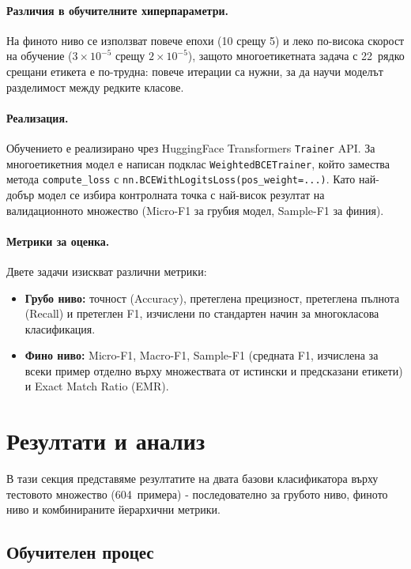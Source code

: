 \documentclass[12pt,a4paper]{report}
\begin{document}
\paragraph{Различия в обучителните хиперпараметри.} На финото ниво се използват повече епохи (10 срещу 5) и леко по-висока скорост на обучение ($3 \times 10^{-5}$ срещу $2 \times 10^{-5}$), защото многоетикетната задача с 22~рядко срещани етикета е по-трудна: повече итерации са нужни, за да научи моделът разделимост между редките класове.

\paragraph{Реализация.} Обучението е реализирано чрез HuggingFace Transformers \texttt{Trainer} API. За многоетикетния модел е написан подклас \texttt{WeightedBCETrainer}, който замества метода \texttt{compute\_loss} с \texttt{nn.BCEWithLogitsLoss(pos\_weight=...)}. Като най-добър модел се избира контролната точка с най-висок резултат на валидационното множество (Micro-F1 за грубия модел, Sample-F1 за финия).

\paragraph{Метрики за оценка.} Двете задачи изискват различни метрики:
\begin{itemize}
  \item \textbf{Грубо ниво:} точност (Accuracy), претеглена прецизност, претеглена пълнота (Recall) и претеглен F1, изчислени по стандартен начин за многокласова класификация.
  \item \textbf{Фино ниво:} Micro-F1, Macro-F1, Sample-F1 (средната F1, изчислена за всеки пример отделно върху множествата от истински и предсказани етикети) и Exact Match Ratio (EMR).
\end{itemize}


\section{Резултати и анализ}

В тази секция представяме резултатите на двата базови класификатора върху тестовото множество (604~примера) - последователно за грубото ниво, финото ниво и комбинираните йерархични метрики.

\subsection{Обучителен процес}
\end{document}
